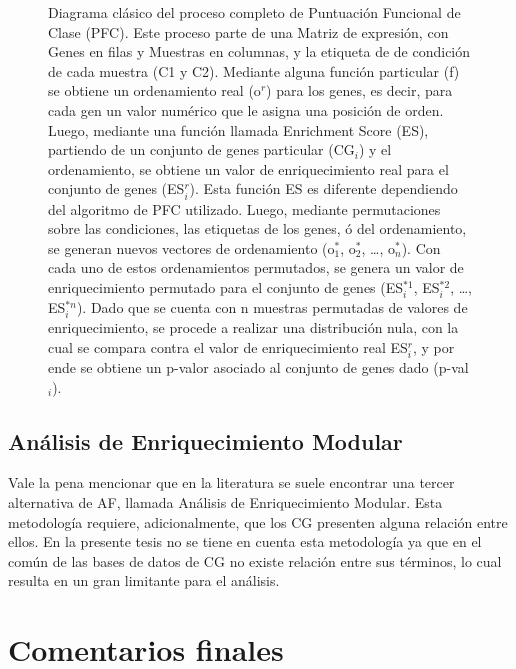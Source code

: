 \documentclass[12pt,twoside]{reedthesis}
\begin{document}
\begin{figure}
\caption{Diagrama clásico del proceso completo de Puntuación Funcional de Clase (PFC). Este proceso parte de una Matriz de expresión, con Genes en filas y Muestras en columnas, y la etiqueta de de condición de cada muestra (C1 y C2). Mediante alguna función particular (f) se obtiene un ordenamiento real (o\(^r\)) para los genes, es decir, para cada gen un valor numérico que le asigna una posición de orden. Luego, mediante una función llamada Enrichment Score (ES), partiendo de un conjunto de genes particular (CG\(_i\)) y el ordenamiento, se obtiene un valor de enriquecimiento real para el conjunto de genes (ES\(^r_i\)). Esta función ES es diferente dependiendo del algoritmo de PFC utilizado. Luego, mediante permutaciones sobre las condiciones, las etiquetas de los genes, ó del ordenamiento, se generan nuevos vectores de ordenamiento (o\(^*_1\), o\(^*_2\), \ldots{}, o\(^*_n\)). Con cada uno de estos ordenamientos permutados, se genera un valor de enriquecimiento permutado para el conjunto de genes (ES\(^{*1}_i\), ES\(^{*2}_i\), \ldots{}, ES\(^{*n}_i\)). Dado que se cuenta con n muestras permutadas de valores de enriquecimiento, se procede a realizar una distribución nula, con la cual se compara contra el valor de enriquecimiento real ES\(^r_i\), y por ende se obtiene un p-valor asociado al conjunto de genes dado (p-val\(_i\)).}\label{fig:diagramaFCS}
\end{figure}


\hypertarget{analisis-de-enriquecimiento-modular}{%
\subsection{Análisis de Enriquecimiento Modular}\label{analisis-de-enriquecimiento-modular}}

Vale la pena mencionar que en la literatura se suele encontrar una tercer alternativa de AF, llamada Análisis de Enriquecimiento Modular. Esta metodología requiere, adicionalmente, que los CG presenten alguna relación entre ellos. En la presente tesis no se tiene en cuenta esta metodología ya que en el común de las bases de datos de CG no existe relación entre sus términos, lo cual resulta en un gran limitante para el análisis.

\hypertarget{comentarios-finales}{%
\section{Comentarios finales}\label{comentarios-finales}}
\end{document}
